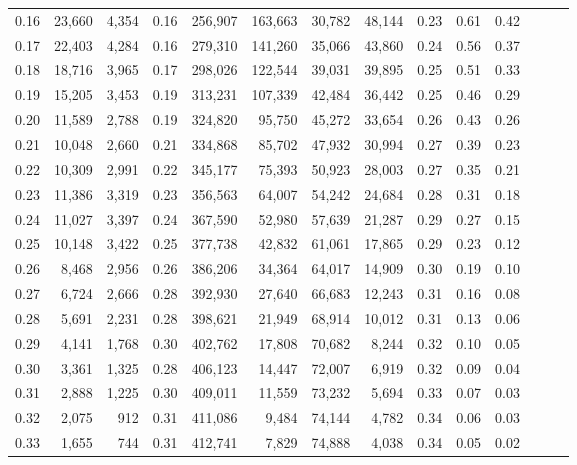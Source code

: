 \begin{tabular}{rrrrrrrrrrrrrr}
0.16 &  23,660 &  4,354 &  0.16 &  256,907 &  163,663 &  30,782 &  48,144 &  0.23 &  0.61 &      0.42 \\
0.17 &  22,403 &  4,284 &  0.16 &  279,310 &  141,260 &  35,066 &  43,860 &  0.24 &  0.56 &      0.37 \\
0.18 &  18,716 &  3,965 &  0.17 &  298,026 &  122,544 &  39,031 &  39,895 &  0.25 &  0.51 &      0.33 \\
0.19 &  15,205 &  3,453 &  0.19 &  313,231 &  107,339 &  42,484 &  36,442 &  0.25 &  0.46 &      0.29 \\
0.20 &  11,589 &  2,788 &  0.19 &  324,820 &   95,750 &  45,272 &  33,654 &  0.26 &  0.43 &      0.26 \\
0.21 &  10,048 &  2,660 &  0.21 &  334,868 &   85,702 &  47,932 &  30,994 &  0.27 &  0.39 &      0.23 \\
0.22 &  10,309 &  2,991 &  0.22 &  345,177 &   75,393 &  50,923 &  28,003 &  0.27 &  0.35 &      0.21 \\
0.23 &  11,386 &  3,319 &  0.23 &  356,563 &   64,007 &  54,242 &  24,684 &  0.28 &  0.31 &      0.18 \\
0.24 &  11,027 &  3,397 &  0.24 &  367,590 &   52,980 &  57,639 &  21,287 &  0.29 &  0.27 &      0.15 \\
0.25 &  10,148 &  3,422 &  0.25 &  377,738 &   42,832 &  61,061 &  17,865 &  0.29 &  0.23 &      0.12 \\
0.26 &   8,468 &  2,956 &  0.26 &  386,206 &   34,364 &  64,017 &  14,909 &  0.30 &  0.19 &      0.10 \\
0.27 &   6,724 &  2,666 &  0.28 &  392,930 &   27,640 &  66,683 &  12,243 &  0.31 &  0.16 &      0.08 \\
0.28 &   5,691 &  2,231 &  0.28 &  398,621 &   21,949 &  68,914 &  10,012 &  0.31 &  0.13 &      0.06 \\
0.29 &   4,141 &  1,768 &  0.30 &  402,762 &   17,808 &  70,682 &   8,244 &  0.32 &  0.10 &      0.05 \\
0.30 &   3,361 &  1,325 &  0.28 &  406,123 &   14,447 &  72,007 &   6,919 &  0.32 &  0.09 &      0.04 \\
0.31 &   2,888 &  1,225 &  0.30 &  409,011 &   11,559 &  73,232 &   5,694 &  0.33 &  0.07 &      0.03 \\
0.32 &   2,075 &    912 &  0.31 &  411,086 &    9,484 &  74,144 &   4,782 &  0.34 &  0.06 &      0.03 \\
0.33 &   1,655 &    744 &  0.31 &  412,741 &    7,829 &  74,888 &   4,038 &  0.34 &  0.05 &      0.02 \\

\end{tabular}
